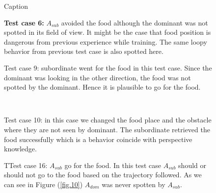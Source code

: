 \documentclass{article}
\begin{document}
\begin{figure}[H]
\begin{center}
\caption{Caption}
\label{fig.tc.5}
\end{center}
\end{figure}
\begin{figure}[H]
\begin{center}
\caption{\textbf {Test  case 6:} \(A_{sub}\) avoided the food although the dominant was not spotted in its field of view. It might be the case that food position is dangerous from previous experience while training. The same loopy behavior from previous test case is also spotted here.}
\label{fig.tc.6}
\end{center}
\end{figure}
\begin{figure}[H]
\begin{center}
\caption{Test  case 9: subordinate went for the food in this test case. Since the dominant was looking in the other direction, the food was not spotted by the dominant. Hence it is plausible to go for the food.  }
\label{fig.tc.9}
\end{center}
\end{figure}
\begin{figure}[H]
\begin{center}
\\
\caption{Test  case 10: in this case we changed the food place and the obstacle where they are not seen by dominant. The subordinate retrieved the food successfully which is a behavior coincide with perspective knowledge.} 
\label{fig.tc.10}
\end{center}
\end{figure}
\begin{figure}[H]
\begin{center}
\label{fig.tc.16}
\caption{TTest  case 16: \(A_{sub}\) go for the food. In this test case \(A_{sub}\) should or should not go to the food based on the trajectory followed. As we can see in Figure (\ref{fig.10}) \(A_{dom}\) was never spotten by \(A_{sub}\).} 
\end{center}
\end{figure}
\end{document}
